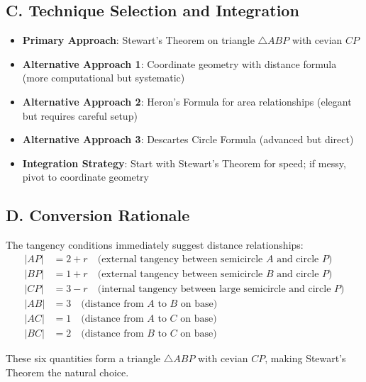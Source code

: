 \documentclass[]{article}
\begin{document}
\begin{techniquesbox}
\subsection*{C. Technique Selection and Integration}
\begin{itemize}[leftmargin=*]
    \item \textbf{Primary Approach}: Stewart's Theorem on triangle $\triangle ABP$ with cevian $CP$
    \item \textbf{Alternative Approach 1}: Coordinate geometry with distance formula (more computational but systematic)
    \item \textbf{Alternative Approach 2}: Heron's Formula for area relationships (elegant but requires careful setup)
    \item \textbf{Alternative Approach 3}: Descartes Circle Formula (advanced but direct)
    \item \textbf{Integration Strategy}: Start with Stewart's Theorem for speed; if messy, pivot to coordinate geometry
\end{itemize}

\subsection*{D. Conversion Rationale}
The tangency conditions immediately suggest distance relationships:
\begin{align*}
|AP| &= 2 + r \quad \text{(external tangency between semicircle $A$ and circle $P$)}\\
|BP| &= 1 + r \quad \text{(external tangency between semicircle $B$ and circle $P$)}\\
|CP| &= 3 - r \quad \text{(internal tangency between large semicircle and circle $P$)}\\
|AB| &= 3 \quad \text{(distance from $A$ to $B$ on base)}\\
|AC| &= 1 \quad \text{(distance from $A$ to $C$ on base)}\\
|BC| &= 2 \quad \text{(distance from $B$ to $C$ on base)}
\end{align*}

These six quantities form a triangle $\triangle ABP$ with cevian $CP$, making Stewart's Theorem the natural choice.
\end{techniquesbox}
\end{document}
